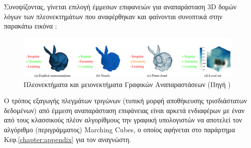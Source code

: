     \clearpage
\par 
    Συνοψίζοντας, γίνεται επιλογή έμμεσων επιφανειών για αναπαράσταση 3D δομών λόγων των πλεονεκτημάτων που αναφέρθηκαν και φαίνονται συνοπτικά στην παρακάτω εικόνα :\\
    \begin{figure}[H]
        \centering
        \includegraphics[width=\linewidth,keepaspectratio]{images/chapter2_img/TrainabillityOfGraphicsRepresentations.jpg}
        \caption{Πλεονεκτήματα και μειονεκτήματα Γραφικών Αναπαραστάσεων (Πηγή \cite{michalkiewicz2019implicit})}
        \label{fig:RepresentationsAdsDis}
    \end{figure}
\par
    Ο τρόπος εξαγωγής πλεγμάτων τριγώνων (τυπική μορφή αποθήκευσης τρισδιάστατων δεδομένων) από έμμεση αναπαράσταση επιφάνειας είναι αρκετά ενδιαφέρων με έναν από τους κλασσικούς πλέον αλγορίθμους την γραφική  υπολογιστών να αποτελεί τον αλγόριθμο  (περιγράμματος) Marching Cubes, ο οποίος αφήνεται στο παράρτημα Κεφ.\ref{chapter:appendix} για τον αναγνώστη.
